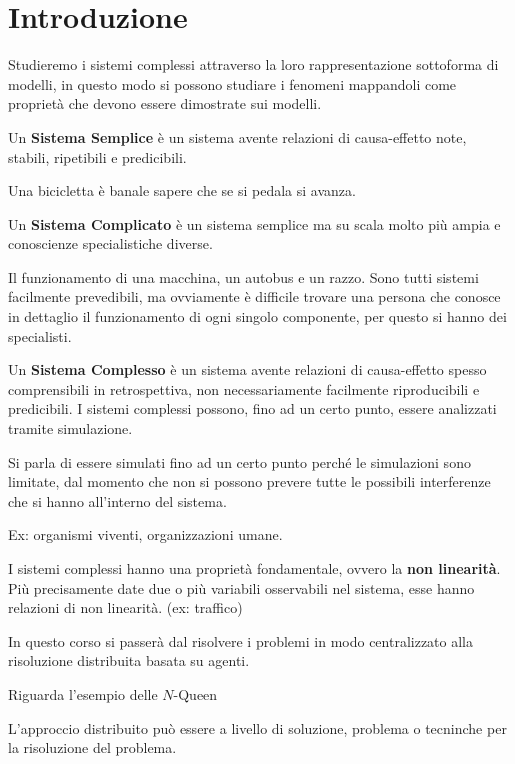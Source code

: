 \chapter{Introduzione}
Studieremo i sistemi complessi attraverso la loro rappresentazione sottoforma di
modelli, in questo modo si possono studiare i fenomeni mappandoli come proprietà
che devono essere dimostrate sui modelli.

\begin{definizione} 
    Un \textbf{Sistema Semplice} è un sistema avente relazioni di causa-effetto
    note, stabili, ripetibili e predicibili.
\end{definizione}

\begin{esempio}
    Una bicicletta è banale sapere che se si pedala si avanza.
\end{esempio}

\begin{definizione} 
    Un \textbf{Sistema Complicato} è un sistema semplice ma su scala molto più ampia
    e conoscienze specialistiche diverse.
\end{definizione}

\begin{esempio}
    Il funzionamento di una macchina, un autobus e un razzo. Sono tutti sistemi 
    facilmente prevedibili, ma ovviamente è difficile trovare una persona che conosce
    in dettaglio il funzionamento di ogni singolo componente, per questo si hanno
    dei specialisti. 
\end{esempio}

\begin{definizione} 
    Un \textbf{Sistema Complesso} è un sistema avente relazioni di causa-effetto
    spesso comprensibili in retrospettiva, non necessariamente facilmente 
    riproducibili e predicibili. I sistemi complessi possono, fino ad un certo punto,
    essere analizzati tramite simulazione. 
\end{definizione}

Si parla di essere simulati fino ad un certo punto perché le simulazioni sono 
limitate, dal momento che non si possono prevere tutte le possibili interferenze che
si hanno all'interno del sistema.

\begin{esempio}
    Ex: organismi viventi, organizzazioni umane.    
\end{esempio}

I sistemi complessi hanno una proprietà fondamentale, ovvero la \textbf{non linearità}.
Più precisamente date due o più variabili osservabili nel sistema, esse hanno 
relazioni di non linearità. (ex: traffico)

In questo corso si passerà dal risolvere i problemi in modo centralizzato alla
risoluzione distribuita basata su agenti.
\begin{esempio}
    Riguarda l'esempio delle $N$-Queen
\end{esempio}

L'approccio distribuito può essere a livello di soluzione, problema o tecninche per
la risoluzione del problema.